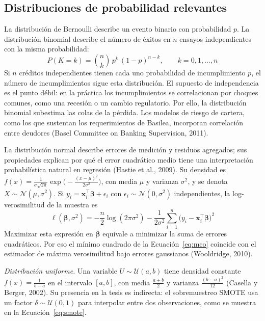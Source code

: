 \subsection{Distribuciones de probabilidad relevantes}
La distribución de Bernoulli describe un evento binario con probabilidad $p$. La distribución binomial describe el número de éxitos en $n$ ensayos independientes con la misma probabilidad:
\begin{equation}
P(K=k) = \binom{n}{k}\,p^k\,(1-p)^{n-k}, \qquad k=0,1,\dots,n
\label{eq:binomial}
\end{equation}
Si $n$ créditos independientes tienen cada uno probabilidad de incumplimiento $p$, el número de incumplimientos sigue esta distribución. El supuesto de independencia es el punto débil: en la práctica los incumplimientos se correlacionan por choques comunes, como una recesión o un cambio regulatorio. Por ello, la distribución binomial subestima las colas de la pérdida. Los modelos de riesgo de cartera, como los que sustentan los requerimientos de Basilea, incorporan correlación entre deudores (Basel Committee on Banking Supervision, 2011).

La distribución normal describe errores de medición y residuos agregados; sus propiedades explican por qué el error cuadrático medio tiene una interpretación probabilística natural en regresión (Hastie et al., 2009). Su densidad es $f(x)=\frac{1}{\sigma\sqrt{2\pi}}\exp\big(-\frac{(x-\mu)^2}{2\sigma^2}\big)$, con media $\mu$ y varianza $\sigma^2$, y se denota $X\sim\mathcal{N}(\mu,\sigma^2)$. Si $y_i=\mathbf{x}_i^\top\boldsymbol{\beta}+\epsilon_i$ con $\epsilon_i\sim\mathcal{N}(0,\sigma^2)$ independientes, la log-verosimilitud de la muestra es
\begin{equation}
\ell(\boldsymbol{\beta},\sigma^2)=-\frac{n}{2}\log(2\pi\sigma^2)-\frac{1}{2\sigma^2}\sum_{i=1}^n\big(y_i-\mathbf{x}_i^\top\boldsymbol{\beta}\big)^2
\label{eq:normal_loglik}
\end{equation}
Maximizar esta expresión en $\boldsymbol{\beta}$ equivale a minimizar la suma de errores cuadráticos. Por eso el mínimo cuadrado de la Ecuación~\eqref{eq:mco} coincide con el estimador de máxima verosimilitud bajo errores gaussianos (Wooldridge, 2010).

\textit{Distribución uniforme.} Una variable $U\sim\mathcal{U}(a,b)$ tiene densidad constante $f(x)=\frac{1}{b-a}$ en el intervalo $[a,b]$, con media $\frac{a+b}{2}$ y varianza $\frac{(b-a)^2}{12}$ (Casella y Berger, 2002). Su presencia en la tesis es indirecta: el sobremuestreo SMOTE usa un factor $\delta\sim\mathcal{U}(0,1)$ para interpolar entre dos observaciones, como se muestra en la Ecuación~\eqref{eq:smote}.

